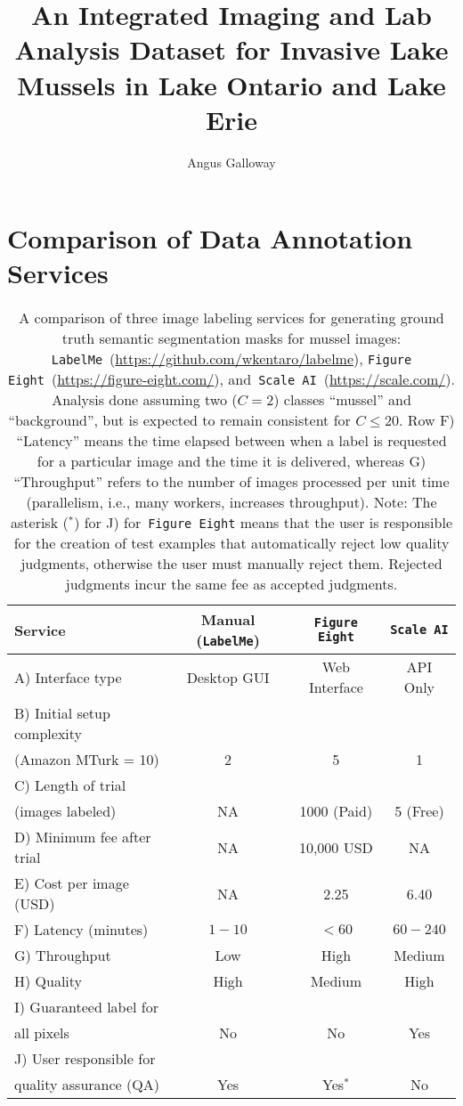 \documentclass[11pt]{article} %
\title{An Integrated Imaging and Lab Analysis Dataset for Invasive Lake Mussels in Lake Ontario and Lake Erie}
\author{Angus Galloway}
\begin{document}
\maketitle

\section{Comparison of Data Annotation Services}

\begin{table}[]
\caption{A comparison of three image labeling services for generating ground
truth semantic segmentation masks for mussel images:
\texttt{LabelMe}~(\url{https://github.com/wkentaro/labelme}),
\texttt{Figure Eight}~(\url{https://figure-eight.com/}),
and~\texttt{Scale AI}~(\url{https://scale.com/}).
Analysis done assuming two ($C=2$) classes ``mussel'' and ``background'', but
is expected to remain consistent for $C \leq 20$. Row F) ``Latency'' means the
time elapsed between when a label is requested for a particular image and the
time it is delivered, whereas G) ``Throughput'' refers to the number of images
processed per unit time (parallelism, i.e., many workers, increases
throughput). Note: The asterisk ($^*$) for J) for~\texttt{Figure Eight} means
that the user is responsible for the creation of test examples that
automatically reject low quality judgments, otherwise the user must manually
reject them. Rejected judgments incur the same fee as accepted judgments.}
\begin{tabular}{lccc}
\toprule
Service & Manual (\texttt{LabelMe}) & \texttt{Figure Eight} & \texttt{Scale AI} 
\\ \midrule
A) Interface type & Desktop GUI & Web Interface & API Only \\ \midrule
B) Initial setup complexity \\ (Amazon MTurk = 10) & 2 & 5 & 1 \\ \midrule
C) Length of trial \\ (images labeled) & NA & 1000 (Paid) & 5 (Free) \\ \midrule
D) Minimum fee after trial & NA & 10,000 USD & NA \\ \midrule
E) Cost per image (USD) & NA & 2.25 & 6.40 \\ \midrule
F) Latency (minutes) & $1-10$ & $< 60$ & $60-240$ \\ \midrule
G) Throughput & Low & High & Medium \\ \midrule
H) Quality & High & Medium & High \\ \midrule
I) Guaranteed label for \\ all pixels & No & No & Yes \\ \midrule
J) User responsible for \\ quality assurance (QA) & Yes & Yes$^*$ & No \\ 
\bottomrule
\end{tabular}
\end{table}
\end{document}
